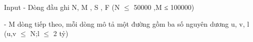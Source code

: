 Input
- Dòng đầu ghi N, M , S , F (N $\le$  50000 ,M ≤ 100000)   


   - M dòng tiếp theo, mỗi dòng mô tả một đường gồm ba số nguyên dương u, v, l (u,v $\le$ N;l $\le$ 2 tỷ)
